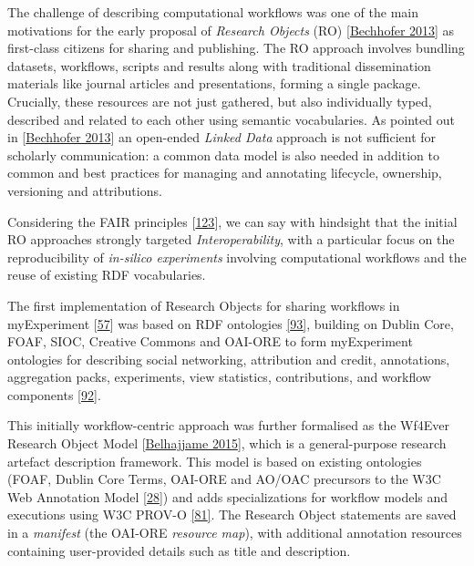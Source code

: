 The challenge of describing computational workflows was one of the main
motivations for the early proposal of \emph{Research Objects} (RO)
{[}\href{https://www.research.manchester.ac.uk/portal/en/publications/why-linked-data-is-not-enough-for-scientists(479e591e-b295-4478-b0c7-a145c19dcd45).html}{Bechhofer 2013}{]}
as first-class citizens for sharing and publishing. The RO approach
involves bundling datasets, workflows, scripts and results along with
traditional dissemination materials like journal articles and
presentations, forming a single package. Crucially, these resources are
not just gathered, but also individually typed, described and related to
each other using semantic vocabularies. As pointed out in
{[}\href{https://doi.org/10.1016/j.future.2011.08.004}{Bechhofer 2013}{]} an
open-ended \emph{Linked Data} approach is not sufficient for scholarly
communication: a common data model is also needed in addition to common
and best practices for managing and annotating lifecycle, ownership,
versioning and attributions.

Considering the FAIR principles
{[}\href{https://doi.org/10.1038/sdata.2016.18}{123}{]}, we can say with
hindsight that the initial RO approaches strongly targeted
\emph{Interoperability}, with a particular focus on the reproducibility
of \emph{in-silico experiments} involving computational workflows and
the reuse of existing RDF vocabularies.

The first implementation of Research Objects for sharing workflows in
myExperiment {[}\href{https://doi.org/10.1093/nar/gkq429}{57}{]} was
based on RDF ontologies
\href{http://ceur-ws.org/Vol-523/Newman.pdf}{{[}93{]}}, building on
Dublin Core, FOAF, SIOC, Creative Commons and OAI-ORE to form
myExperiment ontologies for describing social networking, attribution
and credit, annotations, aggregation packs, experiments, view
statistics, contributions, and workflow components
\href{https://web.archive.org/web/20091115080336/http\%3a\%2f\%2frdf.myexperiment.org/ontologies}{{[}92{]}}.

This initially workflow-centric approach was further formalised as the
Wf4Ever Research Object Model
{[}\href{https://doi.org/10.1016/j.websem.2015.01.003}{Belhajjame 2015}{]}, which is
a general-purpose research artefact description framework. This model is
based on existing ontologies (FOAF, Dublin Core Terms, OAI-ORE and
AO/OAC precursors to the W3C Web Annotation Model
\href{https://www.w3.org/TR/2017/REC-annotation-model-20170223/}{{[}28{]}})
and adds specializations for workflow models and executions using W3C
PROV-O \href{https://www.w3.org/TR/2013/REC-prov-o-20130430/}{{[}81{]}}.
The Research Object statements are saved in a \emph{manifest} (the
OAI-ORE \emph{resource map}), with additional annotation resources
containing user-provided details such as title and description.

